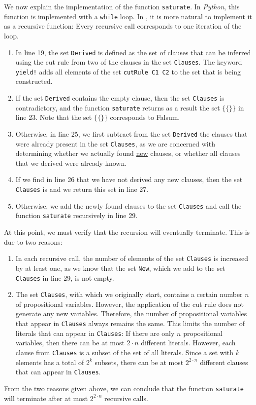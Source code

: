 We now explain the implementation of the function \texttt{saturate}.  In \textsl{Python}, this function is
implemented with a \texttt{while} loop.  In \Fsharp, it is more natural to implement it as a recursive
function:  Every recursive call corresponds to one iteration of the loop.
\begin{enumerate}
\item In line 19, the set \texttt{Derived} is defined as the set of clauses that can be inferred using the
      cut rule from two of the clauses in the set \texttt{Clauses}.  The keyword \texttt{yield!} adds all
      elements of the set \texttt{cutRule C1 C2} to the set that is being constructed.
\item If the set \texttt{Derived} contains the empty clause, then the set
      \texttt{Clauses} is contradictory, and the function \texttt{saturate} returns as a result the
      set $\bigl\{ \{\} \bigr\}$ in line 23.  Note that the set $\bigl\{ \{\} \bigr\}$ corresponds to Falsum.
\item Otherwise, in line 25, we first subtract from the set \texttt{Derived} the clauses
      that were already present in the set \texttt{Clauses}, as we are concerned
      with determining whether we actually found 
      \underline{new} clauses, or whether all clauses that we derived were already known.
\item If we find in line 26 that we have not derived any new clauses,
      then the set \texttt{Clauses} is  and we return this set in line 27.
\item Otherwise, we add the newly found clauses to the set
      \texttt{Clauses} and call the function \texttt{saturate} recursively in line 29.
\end{enumerate}
At this point, we must verify that the recursion will eventually
terminate. This is due to two reasons:
\begin{enumerate}
\item In each recursive call, the number of elements of the set \texttt{Clauses}
      is increased by at least one, as we know that the set \texttt{New}, which we add to the
      set \texttt{Clauses} in line 29, is not empty.
\item The set \texttt{Clauses}, with which we originally start, contains a certain number $n$
      of propositional variables. However, the application of the cut rule does not generate any new
      variables. Therefore, the number of propositional variables that appear in
      \texttt{Clauses} always remains the same. This limits the number of literals
      that can appear in \texttt{Clauses}: If there are only $n$ propositional variables,
      then there can be at most $2 \cdot n$ different literals.  However, each clause from \texttt{Clauses} is
      a subset of the set of all literals.  Since a set with $k$ elements has a total of $2^k$
      subsets, there can be at most $2^{2 \cdot n}$ different clauses that can appear in
      \texttt{Clauses}.
\end{enumerate}
From the two reasons given above, we can conclude that the function \texttt{saturate} 
will terminate after at most $2^{2 \cdot n}$ recursive calls.



